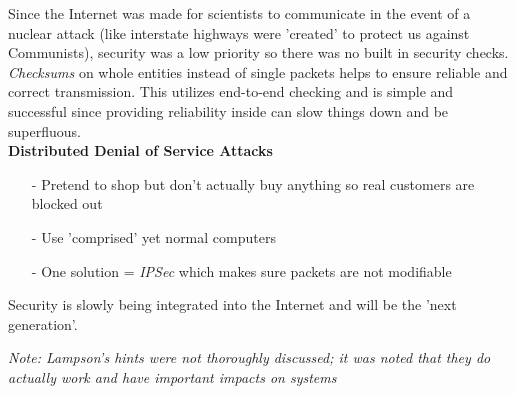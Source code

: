 \documentclass[twoside]{article}
\begin{document}
Since the Internet was made for scientists to communicate in the event of a nuclear attack (like interstate highways were 'created' to protect us against Communists), security was a low priority so there was no built in security checks. \emph{Checksums} on whole entities instead of single packets helps to ensure reliable and correct transmission. This utilizes end-to-end checking and is simple and successful since providing reliability inside can slow things down and be superfluous. \\

{\normalsize \textbf{Distributed Denial of Service Attacks}}
\begin{itemize}
\item[-] Pretend to shop but don't actually buy anything so real customers are blocked out
\item[-] Use 'comprised' yet normal computers
\item[-] One solution = \emph{IPSec} which makes sure packets are not modifiable 
\end{itemize}

Security is slowly being integrated into the Internet and will be the 'next generation'.

\emph{Note: Lampson's hints were not thoroughly discussed; it was noted that they do actually work and have important impacts on systems} 
\end{document}
